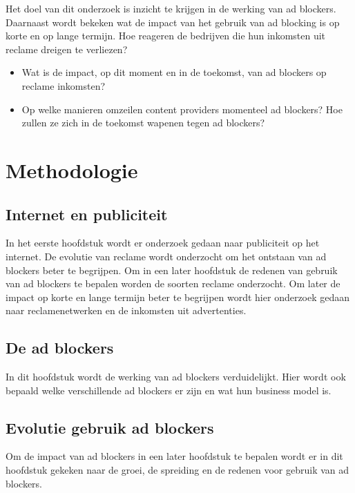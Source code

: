 \documentclass[pdftex,a4paper,12pt,twoside]{report}
\begin{document}
Het doel van dit onderzoek is inzicht te krijgen in de werking van ad blockers. Daarnaast wordt bekeken wat de impact van het gebruik van ad blocking is op korte en op lange termijn. Hoe reageren de bedrijven die hun inkomsten uit reclame dreigen te verliezen?

\begin{itemize}
	\item Wat is de impact, op dit moment en in de toekomst, van ad blockers op reclame inkomsten? 
	\item Op welke manieren omzeilen content providers momenteel ad blockers? Hoe zullen ze zich in de toekomst wapenen tegen ad blockers?
\end{itemize}



\chapter{Methodologie}
\label{ch:methodologie}
\section{Internet en publiciteit}
In het eerste hoofdstuk wordt er onderzoek gedaan naar publiciteit op het internet. De evolutie van reclame wordt onderzocht om het ontstaan van ad blockers beter te begrijpen. Om in een later hoofdstuk de redenen van gebruik van ad blockers te bepalen worden de soorten reclame onderzocht. Om later de impact op korte en lange termijn beter te begrijpen wordt hier onderzoek gedaan naar reclamenetwerken en de inkomsten uit advertenties.
\section{De ad blockers}
In dit hoofdstuk wordt de werking van ad blockers verduidelijkt. Hier wordt ook bepaald welke verschillende ad blockers er zijn en wat hun business model is.
\section{Evolutie gebruik ad blockers}
Om de impact van ad blockers in een later hoofdstuk te bepalen wordt er in dit hoofdstuk gekeken naar de groei, de spreiding en de redenen voor gebruik van ad blockers.
\end{document}
